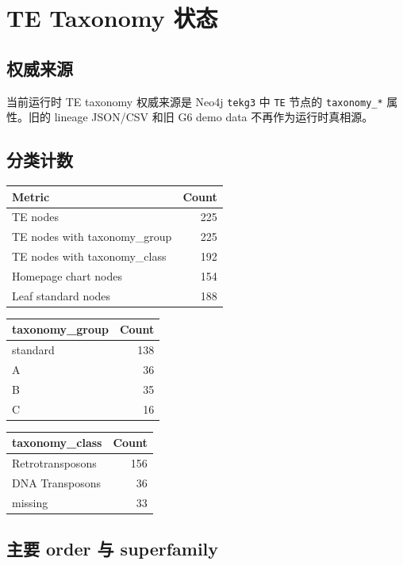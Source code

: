 \documentclass[UTF8]{ctexart}
\begin{document}
\section{TE Taxonomy 状态}

\subsection{权威来源}

当前运行时 TE taxonomy 权威来源是 Neo4j \texttt{tekg3} 中 \texttt{TE} 节点的 \texttt{taxonomy\_*} 属性。旧的 lineage JSON/CSV 和旧 G6 demo data 不再作为运行时真相源。

\subsection{分类计数}

\begin{longtable}{lr}
\toprule
Metric & Count \\
\midrule
\endhead
TE nodes & 225 \\
TE nodes with taxonomy\_group & 225 \\
TE nodes with taxonomy\_class & 192 \\
Homepage chart nodes & 154 \\
Leaf standard nodes & 188 \\
\bottomrule
\end{longtable}

\begin{longtable}{lr}
\toprule
taxonomy\_group & Count \\
\midrule
\endhead
standard & 138 \\
A & 36 \\
B & 35 \\
C & 16 \\
\bottomrule
\end{longtable}

\begin{longtable}{lr}
\toprule
taxonomy\_class & Count \\
\midrule
\endhead
Retrotransposons & 156 \\
DNA Transposons & 36 \\
missing & 33 \\
\bottomrule
\end{longtable}

\subsection{主要 order 与 superfamily}
\end{document}
